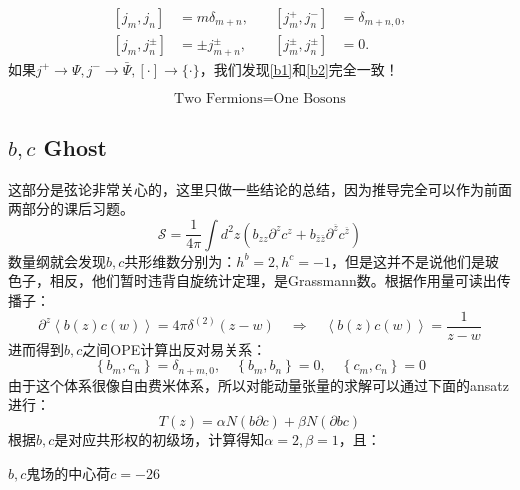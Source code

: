 \begin{equation}\label{b2}
	\boxed{
		\begin{aligned}\left[j_m,j_n\right]&=m\delta_{m+n},\quad&\left[j_m^+,j_n^-\right]&=\delta_{m+n,0},\\\left[j_m,j_n^\pm\right]&=\pm j_{m+n}^\pm,\quad&\left[j_m^\pm,j_n^\pm\right]&=0.\end{aligned}
	}
\end{equation}
如果$j^+\to\Psi,j^-\to \bar \Psi,[\cdot]\to\{\cdot\}$，我们发现\ref{b1}和\ref{b2}完全一致！
\begin{theorem}[Bosonization]
	\begin{equation*}
		\text{Two Fermions} = \text{One Bosons}
	\end{equation*}
\end{theorem}
\subsection{$b,c$ Ghost}
这部分是弦论非常关心的，这里只做一些结论的总结，因为推导完全可以作为前面两部分的课后习题。
\begin{equation}
	\mathcal{S}=\frac1{4\pi}\int d^2z\left(b_{zz}\partial^zc^z+b_{\bar z\bar 
		z}\partial^{\overline{z}}c^{\overline{z}}\right)
\end{equation}
数量纲就会发现$b,c$共形维数分别为：$h^b=2,h^c=-1$，但是这并不是说他们是玻色子，相反，他们暂时违背自旋统计定理，是Grassmann数。根据作用量可读出传播子：
\begin{equation}\label{eq:35.67}
	\partial^z\left\langle b(z)c(w)\right\rangle=4\pi\left.\delta^{(2)}(z-w)\quad\Rightarrow\quad\left\langle b(z)c(w)\right\rangle=\frac1{z-w}\right. 
\end{equation}
进而得到$b,c$之间OPE计算出反对易关系：
\begin{equation}
	\left\{b_m,c_n\right\}=\delta_{n+m,0},\quad\left\{b_m,b_n\right\}=0,\quad\left\{c_m,c_n\right\}=0
\end{equation}
由于这个体系很像自由费米体系，所以对能动量张量的求解可以通过下面的ansatz进行：
\begin{equation}
	T(z)=\alpha N\left(b\partial c\right)+\beta N\left(\partial bc\right)
\end{equation}
根据$b,c$是对应共形权的初级场，计算得知$\alpha=2,\beta=1$，且：
\begin{theorem}
	$b,c$鬼场的中心荷$\boxed{c=-26}$
\end{theorem}

